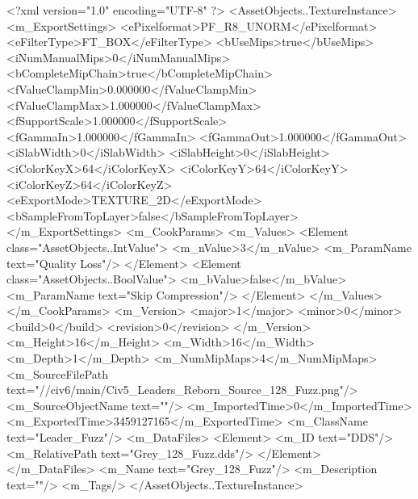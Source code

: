 <?xml version="1.0" encoding="UTF-8" ?>
<AssetObjects..TextureInstance>
	<m_ExportSettings>
		<ePixelformat>PF_R8_UNORM</ePixelformat>
		<eFilterType>FT_BOX</eFilterType>
		<bUseMips>true</bUseMips>
		<iNumManualMips>0</iNumManualMips>
		<bCompleteMipChain>true</bCompleteMipChain>
		<fValueClampMin>0.000000</fValueClampMin>
		<fValueClampMax>1.000000</fValueClampMax>
		<fSupportScale>1.000000</fSupportScale>
		<fGammaIn>1.000000</fGammaIn>
		<fGammaOut>1.000000</fGammaOut>
		<iSlabWidth>0</iSlabWidth>
		<iSlabHeight>0</iSlabHeight>
		<iColorKeyX>64</iColorKeyX>
		<iColorKeyY>64</iColorKeyY>
		<iColorKeyZ>64</iColorKeyZ>
		<eExportMode>TEXTURE_2D</eExportMode>
		<bSampleFromTopLayer>false</bSampleFromTopLayer>
	</m_ExportSettings>
	<m_CookParams>
		<m_Values>
			<Element class="AssetObjects..IntValue">
				<m_nValue>3</m_nValue>
				<m_ParamName text="Quality Loss"/>
			</Element>
			<Element class="AssetObjects..BoolValue">
				<m_bValue>false</m_bValue>
				<m_ParamName text="Skip Compression"/>
			</Element>
		</m_Values>
	</m_CookParams>
	<m_Version>
		<major>1</major>
		<minor>0</minor>
		<build>0</build>
		<revision>0</revision>
	</m_Version>
	<m_Height>16</m_Height>
	<m_Width>16</m_Width>
	<m_Depth>1</m_Depth>
	<m_NumMipMaps>4</m_NumMipMaps>
	<m_SourceFilePath text="//civ6/main/Civ5_Leaders_Reborn\Texture_Source\Grey_128_Fuzz.png"/>
	<m_SourceObjectName text=""/>
	<m_ImportedTime>0</m_ImportedTime>
	<m_ExportedTime>3459127165</m_ExportedTime>
	<m_ClassName text="Leader_Fuzz"/>
	<m_DataFiles>
		<Element>
			<m_ID text="DDS"/>
			<m_RelativePath text="Grey_128_Fuzz.dds"/>
		</Element>
	</m_DataFiles>
	<m_Name text="Grey_128_Fuzz"/>
	<m_Description text=""/>
	<m_Tags/>
</AssetObjects..TextureInstance>

